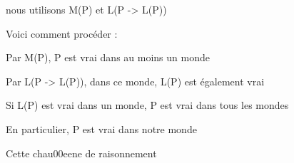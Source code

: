 \documentclass[10pt]{report}
\begin{document}
\begin{coqdoccode}
\begin{coqdoccomment}
nous\coqdocindent{0.50em}
utilisons\coqdocindent{0.50em}
M(P)\coqdocindent{0.50em}
et\coqdocindent{0.50em}
L(P\coqdocindent{0.50em}
->\coqdocindent{0.50em}
L(P))\coqdocindent{0.50em}
\end{coqdoccomment}
\coqdoceol
\coqdocemptyline
\coqdocindent{2.00em}
\begin{coqdoccomment}
\coqdocindent{0.50em}
Voici\coqdocindent{0.50em}
comment\coqdocindent{0.50em}
procéder\coqdocindent{0.50em}
:\coqdocindent{0.50em}
\end{coqdoccomment}
\coqdoceol
\coqdocindent{2.00em}
\begin{coqdoccomment}
\coqdocindent{0.50em}
Par\coqdocindent{0.50em}
M(P),\coqdocindent{0.50em}
P\coqdocindent{0.50em}
est\coqdocindent{0.50em}
vrai\coqdocindent{0.50em}
dans\coqdocindent{0.50em}
au\coqdocindent{0.50em}
moins\coqdocindent{0.50em}
un\coqdocindent{0.50em}
monde\coqdocindent{0.50em}
\end{coqdoccomment}
\coqdoceol
\coqdocindent{2.00em}
\begin{coqdoccomment}
\coqdocindent{0.50em}
Par\coqdocindent{0.50em}
L(P\coqdocindent{0.50em}
->\coqdocindent{0.50em}
L(P)),\coqdocindent{0.50em}
dans\coqdocindent{0.50em}
ce\coqdocindent{0.50em}
monde,\coqdocindent{0.50em}
L(P)\coqdocindent{0.50em}
est\coqdocindent{0.50em}
également\coqdocindent{0.50em}
vrai\coqdocindent{0.50em}
\end{coqdoccomment}
\coqdoceol
\coqdocindent{2.00em}
\begin{coqdoccomment}
\coqdocindent{0.50em}
Si\coqdocindent{0.50em}
L(P)\coqdocindent{0.50em}
est\coqdocindent{0.50em}
vrai\coqdocindent{0.50em}
dans\coqdocindent{0.50em}
un\coqdocindent{0.50em}
monde,\coqdocindent{0.50em}
P\coqdocindent{0.50em}
est\coqdocindent{0.50em}
vrai\coqdocindent{0.50em}
dans\coqdocindent{0.50em}
tous\coqdocindent{0.50em}
les\coqdocindent{0.50em}
mondes\coqdocindent{0.50em}
\end{coqdoccomment}
\coqdoceol
\coqdocindent{2.00em}
\begin{coqdoccomment}
\coqdocindent{0.50em}
En\coqdocindent{0.50em}
particulier,\coqdocindent{0.50em}
P\coqdocindent{0.50em}
est\coqdocindent{0.50em}
vrai\coqdocindent{0.50em}
dans\coqdocindent{0.50em}
notre\coqdocindent{0.50em}
monde\coqdocindent{0.50em}
\end{coqdoccomment}
\coqdoceol
\coqdocemptyline
\coqdocindent{2.00em}
\begin{coqdoccomment}
\coqdocindent{0.50em}
Cette\coqdocindent{0.50em}
chau00eene\coqdocindent{0.50em}
de\coqdocindent{0.50em}
raisonnement\coqdocindent{0.50em}

\end{coqdoccomment}
\end{coqdoccode}
\end{document}
